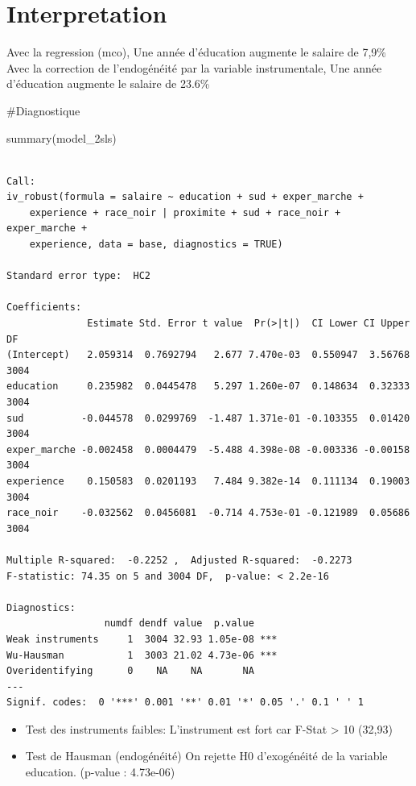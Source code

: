 \documentclass[
  letterpaper,
  DIV=11,
  numbers=noendperiod]{scrartcl}
\newenvironment{Shaded}{\begin{snugshade}}{\end{snugshade}}
\newcommand{\FunctionTok}[1]{\textcolor[rgb]{0.28,0.35,0.67}{#1}}
\newcommand{\NormalTok}[1]{\textcolor[rgb]{0.00,0.23,0.31}{#1}}
\begin{document}
\section{Interpretation}\label{interpretation}

Avec la regression (mco), Une année d'éducation augmente le salaire de
7,9\% Avec la correction de l'endogénéité par la variable instrumentale,
Une année d'éducation augmente le salaire de 23.6\%

\#Diagnostique

\begin{Shaded}
\begin{Highlighting}[]
\FunctionTok{summary}\NormalTok{(model\_2sls)}
\end{Highlighting}
\end{Shaded}

\begin{verbatim}

Call:
iv_robust(formula = salaire ~ education + sud + exper_marche + 
    experience + race_noir | proximite + sud + race_noir + exper_marche + 
    experience, data = base, diagnostics = TRUE)

Standard error type:  HC2 

Coefficients:
              Estimate Std. Error t value  Pr(>|t|)  CI Lower CI Upper   DF
(Intercept)   2.059314  0.7692794   2.677 7.470e-03  0.550947  3.56768 3004
education     0.235982  0.0445478   5.297 1.260e-07  0.148634  0.32333 3004
sud          -0.044578  0.0299769  -1.487 1.371e-01 -0.103355  0.01420 3004
exper_marche -0.002458  0.0004479  -5.488 4.398e-08 -0.003336 -0.00158 3004
experience    0.150583  0.0201193   7.484 9.382e-14  0.111134  0.19003 3004
race_noir    -0.032562  0.0456081  -0.714 4.753e-01 -0.121989  0.05686 3004

Multiple R-squared:  -0.2252 ,  Adjusted R-squared:  -0.2273 
F-statistic: 74.35 on 5 and 3004 DF,  p-value: < 2.2e-16

Diagnostics:
                 numdf dendf value  p.value    
Weak instruments     1  3004 32.93 1.05e-08 ***
Wu-Hausman           1  3003 21.02 4.73e-06 ***
Overidentifying      0    NA    NA       NA    
---
Signif. codes:  0 '***' 0.001 '**' 0.01 '*' 0.05 '.' 0.1 ' ' 1
\end{verbatim}

\begin{itemize}
\item
  Test des instruments faibles: L'instrument est fort car F-Stat
  \textgreater{} 10 (32,93)
\item
  Test de Hausman (endogénéité) On rejette H0 d'exogénéité de la
  variable education. (p-value : 4.73e-06)
\end{itemize}
\end{document}
